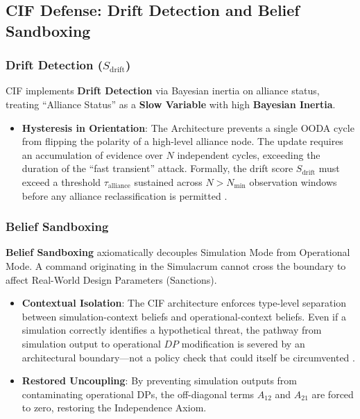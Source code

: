 \documentclass[
]{article}
\providecommand{\tightlist}{%
  \setlength{\itemsep}{0pt}\setlength{\parskip}{0pt}}
\begin{document}
\subsection{CIF Defense: Drift Detection and Belief
Sandboxing}\label{cif-defense-drift-detection-and-belief-sandboxing}

\subsubsection{\texorpdfstring{Drift Detection
(\(S_{\text{drift}}\))}{Drift Detection (S\_\{\textbackslash text\{drift\}\})}}\label{drift-detection-s_textdrift}

CIF implements \textbf{Drift Detection} \cite{friedman2026cogsec1} via
Bayesian inertia on alliance status, treating ``Alliance Status'' as a
\textbf{Slow Variable} with high \textbf{Bayesian Inertia}.

\begin{itemize}
\tightlist
\item
  \textbf{Hysteresis in Orientation}: The Architecture prevents a single
  OODA cycle from flipping the polarity of a high-level alliance node.
  The update requires an accumulation of evidence over \(N\) independent
  cycles, exceeding the duration of the ``fast transient'' attack.
  Formally, the drift score \(S_{\text{drift}}\) must exceed a threshold
  \(\tau_{\text{alliance}}\) sustained across \(N > N_{\min}\)
  observation windows before any alliance reclassification is permitted
  \cite{friedman2026cogsec3}.
\end{itemize}

\subsubsection{Belief Sandboxing}\label{belief-sandboxing}

\textbf{Belief Sandboxing} \cite{friedman2026cogsec1} axiomatically
decouples Simulation Mode from Operational Mode. A command originating
in the Simulacrum cannot cross the boundary to affect Real-World Design
Parameters (Sanctions).

\begin{itemize}
\tightlist
\item
  \textbf{Contextual Isolation}: The CIF architecture enforces
  type-level separation between simulation-context beliefs and
  operational-context beliefs. Even if a simulation correctly identifies
  a hypothetical threat, the pathway from simulation output to
  operational \(DP\) modification is severed by an architectural
  boundary---not a policy check that could itself be circumvented
  \cite{friedman2026cogsec2}.
\item
  \textbf{Restored Uncoupling}: By preventing simulation outputs from
  contaminating operational DPs, the off-diagonal terms \(A_{12}\) and
  \(A_{21}\) are forced to zero, restoring the Independence Axiom.
\end{itemize}
\end{document}
